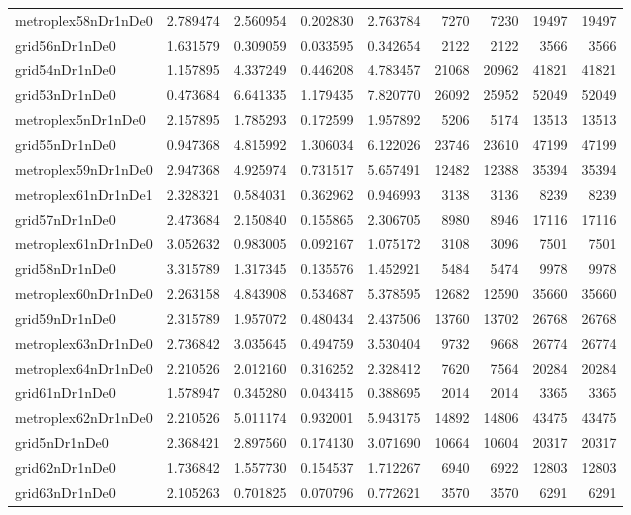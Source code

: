 \begin{longtable}{|l|r|r|r|r|r|r|r|r|}
metroplex58nDr1nDe0 & 2.789474 & 2.560954 & 0.202830 & 2.763784 & 7270 & 7230 & 19497 & 19497 \\
grid56nDr1nDe0 & 1.631579 & 0.309059 & 0.033595 & 0.342654 & 2122 & 2122 & 3566 & 3566 \\
grid54nDr1nDe0 & 1.157895 & 4.337249 & 0.446208 & 4.783457 & 21068 & 20962 & 41821 & 41821 \\
grid53nDr1nDe0 & 0.473684 & 6.641335 & 1.179435 & 7.820770 & 26092 & 25952 & 52049 & 52049 \\
metroplex5nDr1nDe0 & 2.157895 & 1.785293 & 0.172599 & 1.957892 & 5206 & 5174 & 13513 & 13513 \\
grid55nDr1nDe0 & 0.947368 & 4.815992 & 1.306034 & 6.122026 & 23746 & 23610 & 47199 & 47199 \\
metroplex59nDr1nDe0 & 2.947368 & 4.925974 & 0.731517 & 5.657491 & 12482 & 12388 & 35394 & 35394 \\
metroplex61nDr1nDe1 & 2.328321 & 0.584031 & 0.362962 & 0.946993 & 3138 & 3136 & 8239 & 8239 \\
grid57nDr1nDe0 & 2.473684 & 2.150840 & 0.155865 & 2.306705 & 8980 & 8946 & 17116 & 17116 \\
metroplex61nDr1nDe0 & 3.052632 & 0.983005 & 0.092167 & 1.075172 & 3108 & 3096 & 7501 & 7501 \\
grid58nDr1nDe0 & 3.315789 & 1.317345 & 0.135576 & 1.452921 & 5484 & 5474 & 9978 & 9978 \\
metroplex60nDr1nDe0 & 2.263158 & 4.843908 & 0.534687 & 5.378595 & 12682 & 12590 & 35660 & 35660 \\
grid59nDr1nDe0 & 2.315789 & 1.957072 & 0.480434 & 2.437506 & 13760 & 13702 & 26768 & 26768 \\
metroplex63nDr1nDe0 & 2.736842 & 3.035645 & 0.494759 & 3.530404 & 9732 & 9668 & 26774 & 26774 \\
metroplex64nDr1nDe0 & 2.210526 & 2.012160 & 0.316252 & 2.328412 & 7620 & 7564 & 20284 & 20284 \\
grid61nDr1nDe0 & 1.578947 & 0.345280 & 0.043415 & 0.388695 & 2014 & 2014 & 3365 & 3365 \\
metroplex62nDr1nDe0 & 2.210526 & 5.011174 & 0.932001 & 5.943175 & 14892 & 14806 & 43475 & 43475 \\
grid5nDr1nDe0 & 2.368421 & 2.897560 & 0.174130 & 3.071690 & 10664 & 10604 & 20317 & 20317 \\
grid62nDr1nDe0 & 1.736842 & 1.557730 & 0.154537 & 1.712267 & 6940 & 6922 & 12803 & 12803 \\
grid63nDr1nDe0 & 2.105263 & 0.701825 & 0.070796 & 0.772621 & 3570 & 3570 & 6291 & 6291 \\

\end{longtable}
